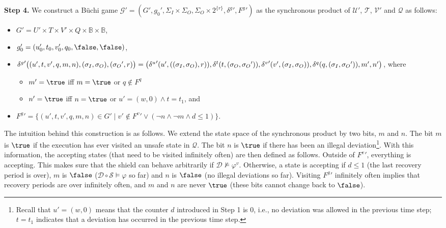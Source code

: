 \documentclass{llncs}
\newcommand{\buchi}{B\"uchi\xspace}
\newcommand{\B}{\mathbb{B}}
\newcommand{\design}{\mathcal{D}}
\newcommand{\shield}{\mathcal{S}}
\newcommand{\dinalph}{\Sigma_I}
\newcommand{\dinletter}{{\sigma_I}}
\newcommand{\doutalph}{\Sigma_O}
\newcommand{\doutletter}{{\sigma_O}}
\newcommand{\spec}{\varphi}
\newcommand{\specv}{\varphi^v}
\newcommand{\comp}{\circ}
\begin{document}
\noindent
\textbf{Step 4.} We construct a \buchi game $\mathcal{G}' = (G', g_0', 
\dinalph \times \doutalph, \doutalph \times 2^{\{r\}}, {\delta^g}', 
{F^g}')$ as the synchronous product of $\mathcal{U}'$, $\mathcal{T}$, 
$\mathcal{V}'$ and $\mathcal{Q}$ as follows: 
\begin{itemize}
\item $G'= U' \times T \times V'  \times Q \times \B \times \B$, 
\item $g_0' = (u_0', t_0, v_0', q_0, \false, \false)$,
\item ${\delta^g}'\bigl((u', t, v', q, m, n), (\dinletter, \doutletter), 
(\doutletter',r) \bigr) =
\bigl(
{\delta^u}'(u',((\dinletter, \doutletter),r)),\\
\delta^t(t,(\doutletter, \doutletter')),
{\delta^v}'(v',(\dinletter, \doutletter)),
\delta^q(q, (\dinletter, \doutletter')),m',n'
\bigr)$,
where
 \begin{itemize}
 \item $m'=\true$ iff $m=\true$ or $q\not \in F^q$
 \item $n'=\true$ iff $n=\true$ or $u'=(w,0) \wedge t=t_1$, and
 \end{itemize}
\item ${F^g}' = \{(u',t,v',q,m,n)\in G' \mid v'\not\in {F^v}' \vee
                   (\neg n \wedge \neg m \wedge d \leq 1)\}$.
\end{itemize}
The intuition behind this construction is as follows.  We extend the 
state space of the synchronous product by two bits, $m$ and $n$.  The 
bit $m$ is $\true$ if the execution has ever visited an unsafe state in 
$\mathcal{Q}$.  The bit $n$ is $\true$ if there has been an illegal 
deviation\footnote{Recall that $u'=(w,0)$ means that the counter $d$ 
introduced in Step 1 is $0$, i.e., no deviation was allowed in the 
previous time step; $t=t_1$ indicates that a deviation has occurred in 
the previous time step.}. With this information, the accepting states 
(that need to be visited infinitely often) are then defined as follows. 
Outside of ${F^v}'$, everything is accepting.  This makes sure that the 
shield can behave arbitrarily if $\design\not\models\specv$.  Otherwise, 
a state is accepting if $d\leq 1$ (the last recovery period is over), 
$m$ is $\false$ ($\design\comp\shield \models \spec$ so far) and $n$ is 
$\false$ (no illegal deviations so far).  Visiting ${F^g}'$ infinitely 
often implies that recovery periods are over infinitely often, and $m$ 
and $n$ are never $\true$ (these bits cannot change back to $\false$).
\end{document}
